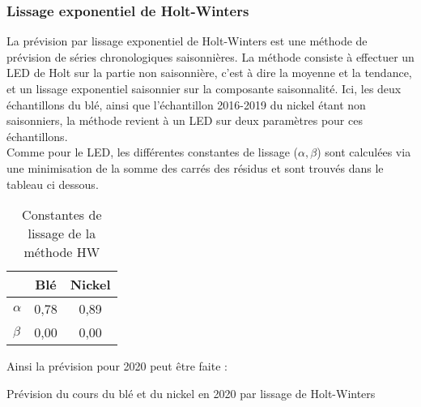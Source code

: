 \subsubsection*{Lissage exponentiel de Holt-Winters}
La prévision par lissage exponentiel de Holt-Winters est une méthode de prévision de séries chronologiques saisonnières. La méthode consiste à effectuer un LED de Holt 
sur la partie non saisonnière, c'est à dire la moyenne et la tendance, et un lissage exponentiel saisonnier sur la composante saisonnalité. Ici, les deux échantillons du
blé, ainsi que l'échantillon 2016-2019 du nickel étant non saisonniers, la méthode revient à un LED sur deux paramètres pour ces échantillons.\\[11pt] 
Comme pour le LED, les différentes constantes de lissage ($\alpha, \beta$) sont calculées via une minimisation de la somme des carrés des résidus et sont trouvés dans le 
tableau ci dessous.
\begin{table}[H]
    \centering
    \caption{Constantes de lissage de la méthode HW}
    \sffamily
    \begin{tabular}{lcc}
        \toprule
        & Blé & Nickel\\
        \midrule
        $\alpha$ & 0,78 & 0,89 \\
        $\beta$ & 0,00 & 0,00\\
        \bottomrule
    \end{tabular}
\end{table}
Ainsi la prévision pour 2020 peut être faite :
\begin{table}[H]
    \centering
    \caption{Prévision du cours du blé et du nickel en 2020 par lissage de Holt-Winters}
    \sffamily
    
\end{table}
